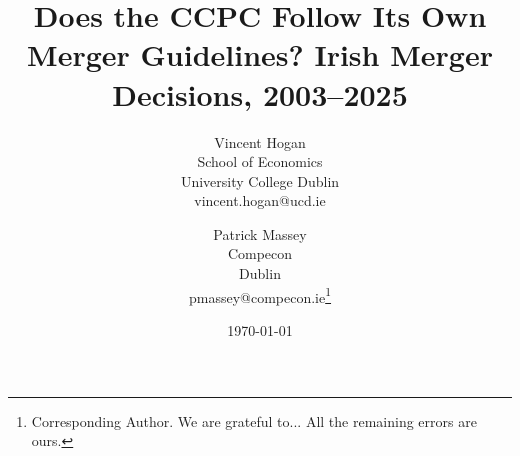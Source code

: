 \documentclass[12pt, a4paper]{article}
\newcommand{\mytitle}{Does the CCPC Follow Its Own Merger Guidelines? Irish Merger Decisions, 2003--2025}
\newcommand{\myabstract}{ %
	Blah
	\newline
	\newline
	Keywords: Merger control; Merger guidelines; HHI; Competition authorities; Ireland.
	\newline
	\newline
	JEL Codes: L40; K21.}
\newcommand{\tks}{%
	We are grateful to... %
	 All the remaining errors are ours.}
\begin{document}
\title{\mytitle}


\author{Vincent Hogan \\
	School of Economics \\
	University College Dublin \\
	vincent.hogan@ucd.ie
	\and 
	Patrick Massey \\
	Compecon \\
	Dublin\\
	pmassey@compecon.ie\thanks{Corresponding Author. \tks}
}

\date{\today}













 
\begin{landscape}
 
 
\end{landscape}












%
\end{document}

